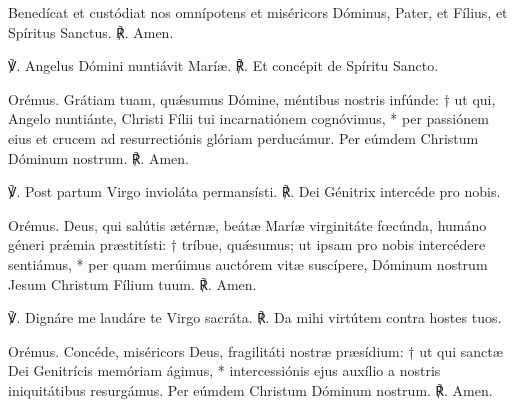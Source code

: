 \perDominum

\dominusVobiscumRep

\benedicamusDomino


Benedícat et custódiat nos
omnípotens et miséricors Dóminus,
Pater, et Fílius, et Spíritus Sanctus.
℟. Amen.





℣. Angelus Dómini nuntiávit Maríæ.
℟. Et concépit de Spíritu Sancto.

Orémus.
Grátiam tuam, quǽsumus Dómine, méntibus nostris infúnde: †
ut qui, Angelo nuntiánte, Christi Fílii tui incarnatiónem cognóvimus, *
per passiónem eius et crucem ad resurrectiónis glóriam perducámur.
Per eúmdem Christum Dóminum nostrum. 
℟. Amen.


℣. Post partum Virgo invioláta permansísti.
℟. Dei Génitrix intercéde pro nobis.

Orémus.
Deus, qui salútis ætérnæ, 
beátæ Maríæ virginitáte fœcúnda,
humáno géneri prǽmia præstitísti: †
tríbue, quǽsumus; ut ipsam pro nobis intercédere sentiámus, *
per quam merúimus auctórem vitæ suscípere,
Dóminum nostrum Jesum Christum Fílium tuum.
℟. Amen.



℣. Dignáre me laudáre te Virgo sacráta.
℟. Da mihi virtútem contra hostes tuos.

Orémus.
Concéde, miséricors Deus, fragilitáti nostræ præsídium: †
ut qui sanctæ Dei Genitrícis memóriam ágimus, *
intercessiónis ejus auxílio a nostris iniquitátibus resurgámus.
Per eúmdem Christum Dóminum nostrum.
℟. Amen. 




